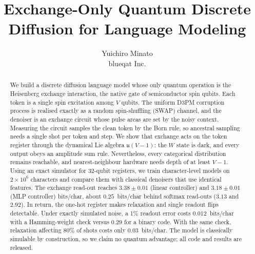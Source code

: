 \documentclass[10pt,twocolumn]{article}
\title{Exchange-Only Quantum Discrete Diffusion for Language Modeling}
\author{Yuichiro Minato\\ \small blueqat Inc.}
\date{}
\theoremstyle{remark}
\begin{document}
\maketitle

\begin{abstract}
We build a discrete diffusion language model whose only quantum operation is the Heisenberg exchange
interaction, the native gate of semiconductor spin qubits. Each token is a single spin excitation among
$V$ qubits. The uniform D3PM corruption process is realised exactly as a random spin-shuffling
(SWAP) channel, and the denoiser is an exchange circuit whose pulse areas are set by the noisy context.
Measuring the circuit samples the clean token by the Born rule, so ancestral sampling needs a single shot
per token and step. We show that exchange acts on the token register through the dynamical Lie algebra
$\mathfrak u(V-1)$: the $W$ state is dark, and every output obeys an amplitude sum rule. Nevertheless,
every categorical distribution remains reachable, and nearest-neighbour hardware needs depth of at
least $V-1$. Using an exact simulator for 32-qubit registers, we train character-level models on
$2\times10^6$ characters and compare them with classical denoisers that use identical features. The
exchange read-out reaches $3.38\pm0.01$ (linear controller) and $3.18\pm0.01$ (MLP controller)
bits/char, about $0.25$~bits/char behind softmax read-outs ($3.13$ and $2.92$). In return, the one-hot
register makes relaxation and single readout flips detectable. Under exactly simulated noise, a 1\%
readout error costs $0.012$~bits/char with a Hamming-weight check versus $0.29$ for a binary code. With
the same check, relaxation affecting 80\% of shots costs only $0.03$~bits/char. The model is classically
simulable by construction, so we claim no quantum advantage; all code and results are released.
\end{abstract}







\end{document}
